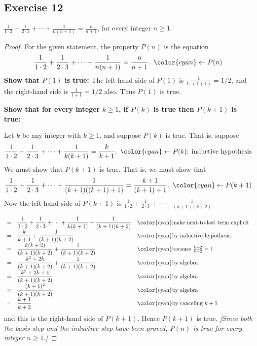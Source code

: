 \documentclass[14pt]{extarticle}
\newcommand{\dps}{\displaystyle}
\newcommand{\from}{\leftarrow}
\newcommand{\cy}{\color{cyan}}
\begin{document}
\subsection{Exercise 12}
$\dps \frac{1}{1 \cdot 2} + \frac{1}{2 \cdot 3} + \cdots + \frac{1}{n(n+1)} = \frac{n}{n+1}$, for every integer $n \geq 1$.

\begin{proof}
    For the given statement, the property $P(n)$ is the equation
    \[
        \dps \frac{1}{1 \cdot 2} + \frac{1}{2 \cdot 3} + \cdots + \frac{1}{n(n+1)} = \frac{n}{n+1}. \,\,\, {\cy \from P(n)}
    \]
    {\bf Show that $P(1)$ is true:} The left-hand side of $P(1)$ is $\frac{1}{1\cdot (1+1)} = 1/2$, and the right-hand side is $\frac{1}{1+1} = 1/2$ also. Thus $P(1)$ is true.

        {\bf Show that for every integer $k \geq 1$, if $P(k)$ is true then $P(k + 1)$ is true:}

    Let $k$ be any integer with $k \geq 1$, and suppose $P(k)$ is true. That is, suppose
    \[
        \dps \frac{1}{1 \cdot 2} + \frac{1}{2 \cdot 3} + \cdots + \frac{1}{k(k+1)} = \frac{k}{k+1}. \,\,\, {\cy \from P(k) \text{: inductive hypothesis}}
    \]
    We must show that $P(k + 1)$ is true. That is, we must show that
    \[
        \dps \frac{1}{1 \cdot 2} + \frac{1}{2 \cdot 3} + \cdots + \frac{1}{(k+1)((k+1)+1)} = \frac{k+1}{(k+1)+1}. \,\,\,{\cy \from P(k+1)}
    \]
    Now the left-hand side of $P(k + 1)$ is $\dps \frac{1}{1 \cdot 2} + \frac{1}{2 \cdot 3} + \cdots + \frac{1}{(k+1)(k+2)}$

    \[
        \begin{array}{lll}
            = & \dps \frac{1}{1 \cdot 2} + \frac{1}{2 \cdot 3} + \cdots + \frac{1}{k(k+1)} + \frac{1}{(k+1)(k+2)} & \text{\cy make next-to-last term explicit} \\
            = & \dps \frac{k}{k+1} + \frac{1}{(k+1)(k+2)}                                                         & \text{\cy by inductive hypothesis}         \\
            = & \dps \frac{k(k+2)}{(k+1)(k+2)} + \frac{1}{(k+1)(k+2)}                                             & \text{\cy because $\frac{k+2}{k+2} = 1$}   \\
            = & \dps \frac{k^2+2k}{(k+1)(k+2)} + \frac{1}{(k+1)(k+2)}                                             & \text{\cy by algebra}                      \\
            = & \dps \frac{k^2+2k+1}{(k+1)(k+2)}                                                                  & \text{\cy by algebra}                      \\
            = & \dps \frac{(k+1)^2}{(k+1)(k+2)}                                                                   & \text{\cy by algebra}                      \\
            = & \dps \frac{k+1}{k+2}                                                                              & \text{\cy by canceling $k+1$}
        \end{array}
    \]
    and this is the right-hand side of $P(k + 1)$. Hence $P(k + 1)$ is true. {\it [Since both the basis step and the inductive step have been proved, $P(n)$ is true for every integer $n \geq 1$.]}
\end{proof}
\end{document}

